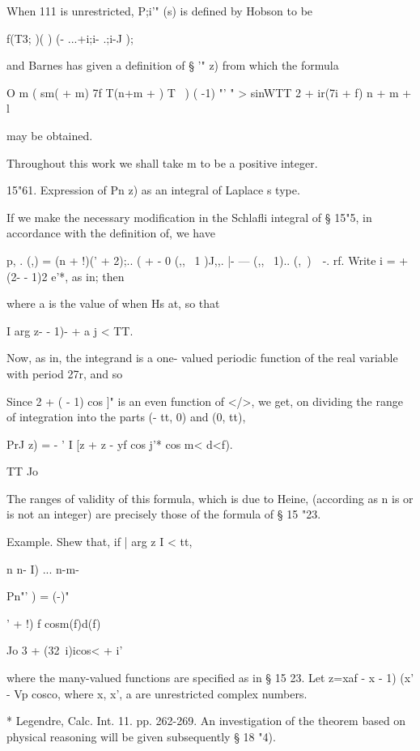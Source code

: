 {{{%
%

When 111 is unrestricted, P;i'" (s) is defined by Hobson to be

f(T3; )( ) (- ...+i;i- .;i-J );

and Barnes has given a definition of § '" z) from which the formula

O m ( sm( + m) 7f T(n+m + ) T \ ) ( -1) "' " > sinWTT 2 + ir(7i + f) n
+ m + l

may be obtained.

Throughout this work we shall take m to be a positive integer.

15"61. Expression of Pn z) as an integral of Laplace s type.

If we make the necessary modification in the Schlafli integral of §
15"5, in accordance with the definition of, we have

p, . (,) = (n + !)(' + 2);.. ( + - 0 (,, \ 1 )J,,. |- --- (,, \ 1)..
(, \,)\ \ -. rf. Write i = + (2- - 1)2 e'*, as in; then

where a is the value of when Hs at, so that

I arg z- - 1)- + a j < TT.

Now, as in, the integrand is a one- valued periodic function
of the real variable with period 27r, and so

Since 2 + ( - 1) cos ]" is an even function of </>, we get, on
dividing the range of integration into the parts (- tt, 0) and (0,
tt),

PrJ z) = - ' I [z + z - yf cos j'* cos m< d<f).

TT Jo

The ranges of validity of this formula, which is due to Heine,
(according as n is or is not an integer) are precisely those of the
formula of § 15 "23.

Example. Shew that, if | arg z I < tt,

n n- I) ... n-m-

Pn"' ) = (-)"

' + !) f cosm(f)d(f)

Jo 3 + (32\ i)icos< + i'

where the many-valued functions are specified as in § 15 23. 
Let z=xaf - x - 1)
(x' - Vp cosco, where x, x', a are unrestricted complex numbers.

* Legendre, Calc. Int. 11. pp. 262-269. An investigation of the
theorem based on physical reasoning will be given subsequently § 18
"4).

}}}

